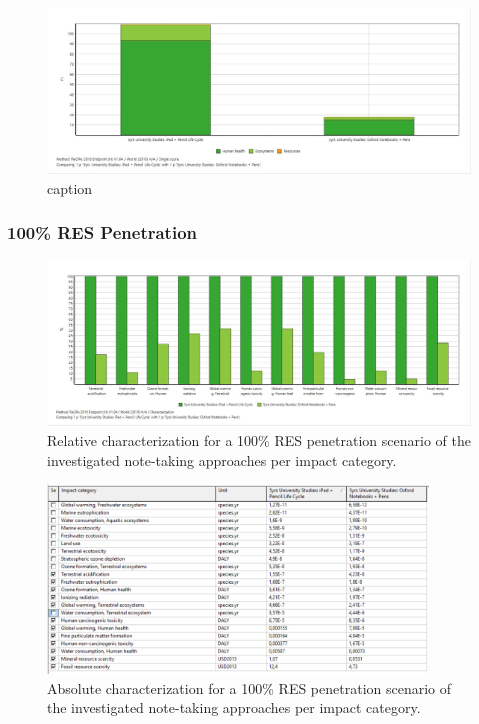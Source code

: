 \begin{figure}[H]
    \centering
    \includegraphics[width=\textwidth]{images/RES_50/Single_Score_RES_50.JPG}
    \caption{caption}\label{fig:single_score_RES50}
\end{figure}

\subsubsection{100\% RES Penetration}

\begin{figure}[H]
    \centering
    \includegraphics[width=\textwidth]{images/RES_100/Characterization_RES_100.JPG}
    \caption{Relative characterization for a 100\% RES penetration scenario of the investigated note-taking approaches per impact category.}\label{fig:characterization_RES_100}
\end{figure}

\begin{figure}[H]
    \centering
    \includegraphics[width=0.9\textwidth]{images/RES_100/Characterization_Table_RES_100.PNG}
    \caption{Absolute characterization for a 100\% RES penetration scenario of the investigated note-taking approaches per impact category.}\label{fig:characterization_table_RES_100}
\end{figure}


